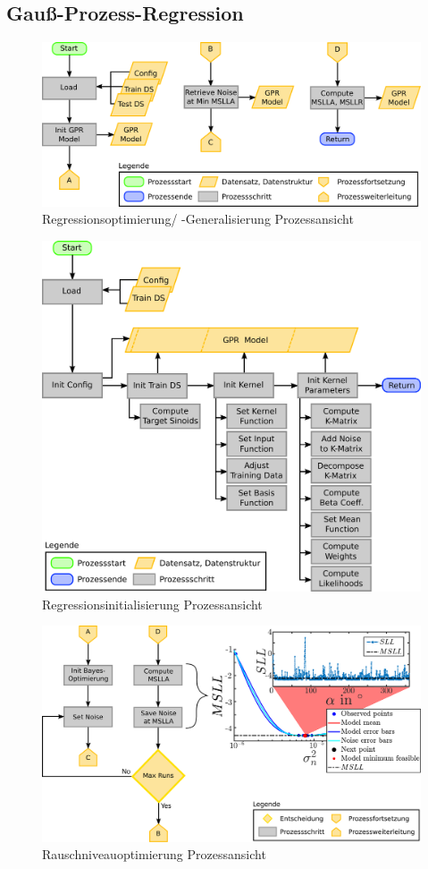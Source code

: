 \clearpage

\subsection{Gauß-Prozess-Regression}\label{sub:gpr-pro}


\begin{figure}[tbph]
	\centering
	\includegraphics[width=.8\linewidth]{chapters/images/3-SW-E-OExp/GPR_Optimization}
	\caption[Regressionsoptimierung/ -Generalisierung Prozessansicht]{Regressionsoptimierung/ -Generalisierung Prozessansicht}
	\label{fig:gproptimization}
\end{figure}


\begin{figure}[htbp]
	\centering
	\includegraphics[width=0.7\linewidth]{chapters/images/3-SW-E-OExp/GPR_Initialization}
	\caption[Regressionsinitialisierung Prozessansicht]{Regressionsinitialisierung Prozessansicht}
	\label{fig:gprinitialization}
\end{figure}


\begin{figure}[tbph]
	\centering
	\includegraphics[width=0.85\linewidth]{chapters/images/3-SW-E-OExp/Noise_Optimization}
	\caption[Rauschniveauoptimierung Prozessansicht]{Rauschniveauoptimierung Prozessansicht}
	\label{fig:noiseoptimization}
\end{figure}


